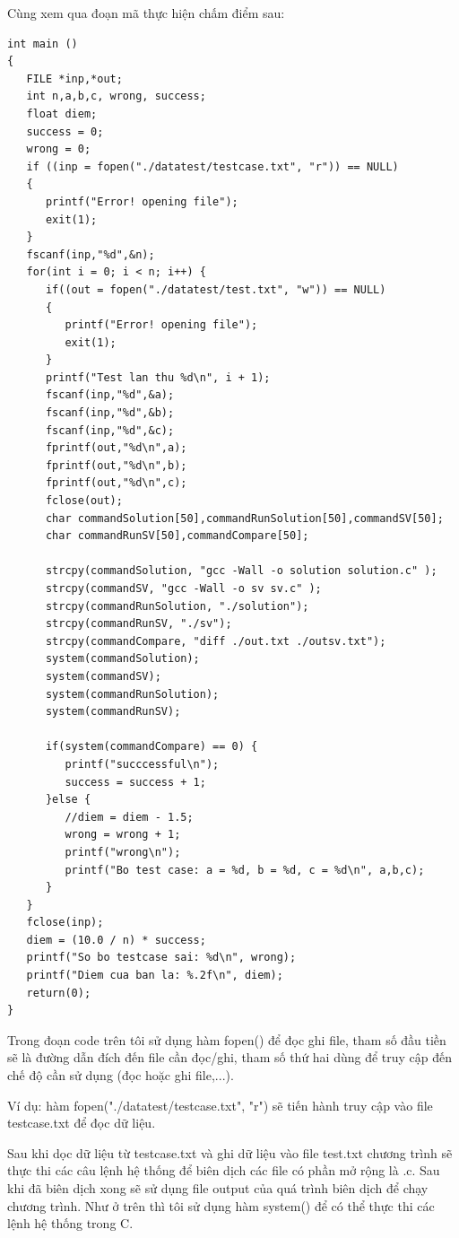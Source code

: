 \documentclass[12pt,a4paper]{article}
\begin{document}
Cùng xem qua đoạn mã thực hiện chấm điểm sau:

\begin{lstlisting}
int main ()
{
   FILE *inp,*out;
   int n,a,b,c, wrong, success;
   float diem;
   success = 0;
   wrong = 0;
   if ((inp = fopen("./datatest/testcase.txt", "r")) == NULL)
   {
      printf("Error! opening file");
      exit(1);         
   }
   fscanf(inp,"%d",&n);
   for(int i = 0; i < n; i++) {
      if((out = fopen("./datatest/test.txt", "w")) == NULL)
      {
         printf("Error! opening file");
         exit(1);         
      }
      printf("Test lan thu %d\n", i + 1);
      fscanf(inp,"%d",&a);
      fscanf(inp,"%d",&b);
      fscanf(inp,"%d",&c);
      fprintf(out,"%d\n",a);
      fprintf(out,"%d\n",b);
      fprintf(out,"%d\n",c);
      fclose(out);
      char commandSolution[50],commandRunSolution[50],commandSV[50];
      char commandRunSV[50],commandCompare[50];

      strcpy(commandSolution, "gcc -Wall -o solution solution.c" );
      strcpy(commandSV, "gcc -Wall -o sv sv.c" );
      strcpy(commandRunSolution, "./solution");
      strcpy(commandRunSV, "./sv");
      strcpy(commandCompare, "diff ./out.txt ./outsv.txt");
      system(commandSolution);
      system(commandSV);
      system(commandRunSolution);
      system(commandRunSV);

      if(system(commandCompare) == 0) {
         printf("succcessful\n");
         success = success + 1;
      }else {
         //diem = diem - 1.5;
         wrong = wrong + 1;
         printf("wrong\n");
         printf("Bo test case: a = %d, b = %d, c = %d\n", a,b,c);
      }
   }
   fclose(inp);
   diem = (10.0 / n) * success;
   printf("So bo testcase sai: %d\n", wrong);
   printf("Diem cua ban la: %.2f\n", diem);
   return(0);
}
\end{lstlisting}

Trong đoạn code trên tôi sử dụng hàm fopen() để đọc ghi file, tham số đầu tiền sẽ là đường dẫn đích đến file cần đọc/ghi, tham số thứ hai dùng để truy cập đến chế độ cần sử dụng (đọc hoặc ghi file,...).

Ví dụ: hàm fopen("./datatest/testcase.txt", "r") sẽ tiến hành truy cập vào file testcase.txt để đọc dữ liệu.

Sau khi dọc dữ liệu từ testcase.txt và ghi dữ liệu vào file test.txt chương trình sẽ thực thi các câu lệnh hệ thống để biên dịch các file có phần mở rộng là .c. Sau khi đã biên dịch xong sẽ sử dụng file output của quá trình biên dịch để chạy chương trình. Như ở trên thì tôi sử dụng hàm system() để có thể thực thi các lệnh hệ thống trong C.
\end{document}
